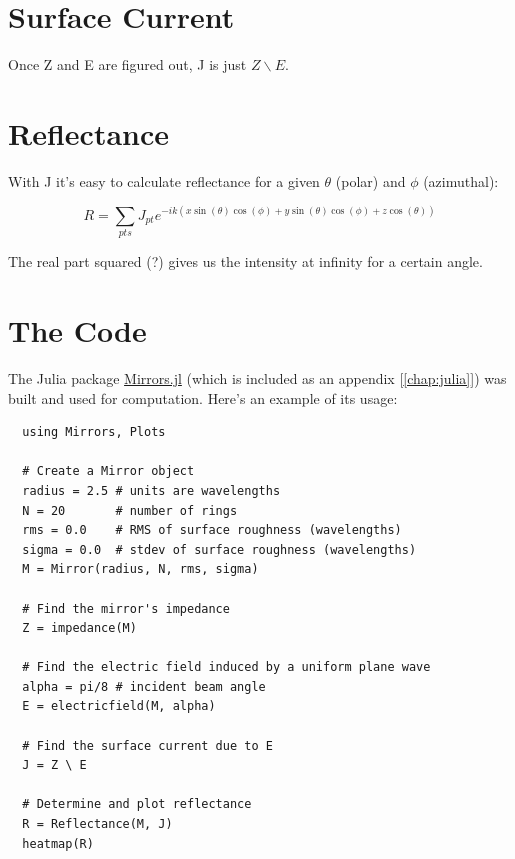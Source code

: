\documentclass[etd,twoside,senior]{BYUPhys}
\begin{document}
\section{Surface Current} \label{sec:current}

Once Z and E are figured out, J is just $Z\backslash E$.



\section{Reflectance} \label{sec:reflectance}

With J it's easy to calculate reflectance for a given $\theta$ (polar) and $\phi$ (azimuthal):

\begin{equation}
  R=\sum_{pts}J_{pt}e^{-ik\left(x\sin\left(\theta\right)\cos\left(\phi\right)+y\sin\left(\theta\right)\cos\left(\phi\right)+z\cos\left(\theta\right)\right)}
\end{equation}

The real part squared (?) gives us the intensity at infinity for a certain angle.







\section{The Code}\label{sec:code}

The Julia package \href{https://github.com/mjg0/Mirrors.jl}{Mirrors.jl} (which is included as an appendix [\ref{chap:julia}]) was built and used for computation. Here's an example of its usage:

\begin{verbatim}
  using Mirrors, Plots

  # Create a Mirror object
  radius = 2.5 # units are wavelengths
  N = 20       # number of rings
  rms = 0.0    # RMS of surface roughness (wavelengths)
  sigma = 0.0  # stdev of surface roughness (wavelengths)
  M = Mirror(radius, N, rms, sigma)

  # Find the mirror's impedance
  Z = impedance(M)

  # Find the electric field induced by a uniform plane wave
  alpha = pi/8 # incident beam angle
  E = electricfield(M, alpha)

  # Find the surface current due to E
  J = Z \ E

  # Determine and plot reflectance
  R = Reflectance(M, J)
  heatmap(R)
\end{verbatim}
\end{document}
